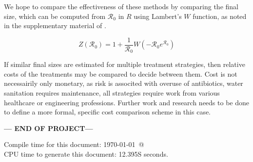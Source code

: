 \documentclass[12pt]{article}\usepackage[]{graphicx}\usepackage[]{color}
\begin{document}
We hope to compare the effectiveness of these methods by comparing the final size, which can be computed from ${\mathcal R_0}$ in $R$ using Lambert's $W$ function, as noted in the supplementary material of \cite{link20}.
\begin{linenomath}
\begin{equation}
    Z({\mathcal R_0}) = 1+\frac{1}{{\mathcal R_0}}W(-{\mathcal R_0}e^{{\mathcal R_0}})
\end{equation}
\end{linenomath}
If similar final sizes are estimated for multiple treatment strategies, then relative costs of the treatments may be compared to decide between them.
Cost is not necessairily only monetary, as risk is associted with overuse of antibiotics, water sanitation requires maintenance, all strategies require work from various healthcare or engineering professions.
Further work and research needs to be done to define a more formal, specific cost comparison scheme in this case.



\bigskip\vfill
\centerline{\bf--- END OF PROJECT---}
\bigskip
Compile time for this document:
\today\ @ \thistime\\
CPU time to generate this document: 12.395S seconds.
\printbibliography
\end{document}
